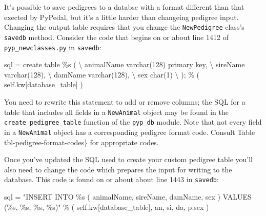 \documentclass[
  letterpaper,
  DIV=11,
  numbers=noendperiod]{scrreprt}
\newenvironment{Shaded}{\begin{snugshade}}{\end{snugshade}}
\newcommand{\NormalTok}[1]{\textcolor[rgb]{0.00,0.23,0.31}{#1}}
\newcommand{\OperatorTok}[1]{\textcolor[rgb]{0.37,0.37,0.37}{#1}}
\newcommand{\SpecialCharTok}[1]{\textcolor[rgb]{0.37,0.37,0.37}{#1}}
\newcommand{\StringTok}[1]{\textcolor[rgb]{0.13,0.47,0.30}{#1}}
\newcommand{\VariableTok}[1]{\textcolor[rgb]{0.07,0.07,0.07}{#1}}
\begin{document}
It's possible to save pedigrees to a databse with a format different
than that exected by PyPedal, but it's a little harder than changeing
pedigree input. Changing the output table requires that you change the
\texttt{NewPedigree} class's \texttt{savedb} method. Consider the code
that begins on or about line 1412 of \texttt{pyp\_newclasses.py} in
\texttt{savedb}:

\begin{Shaded}
\begin{Highlighting}[]
\NormalTok{sql }\OperatorTok{=} \StringTok{\textquotesingle{}create table }\SpecialCharTok{\%s}\StringTok{ ( }\OperatorTok{\textbackslash{}}
\StringTok{    animalName   varchar(128) primary key, }\OperatorTok{\textbackslash{}}
\StringTok{    sireName     varchar(128), }\OperatorTok{\textbackslash{}}
\StringTok{    damName      varchar(128), }\OperatorTok{\textbackslash{}}
\StringTok{    sex          char(1) }\OperatorTok{\textbackslash{}}
\StringTok{    );\textquotesingle{}} \OperatorTok{\%}\NormalTok{ ( }\VariableTok{self}\NormalTok{.kw[}\StringTok{\textquotesingle{}database\_table\textquotesingle{}}\NormalTok{] )}
\end{Highlighting}
\end{Shaded}

You need to rewrite this statement to add or remove columns; the SQL for
a table that includes all fields in a \texttt{NewAnimal} object may be
found in the \texttt{create\_pedigree\_table} function of the
\texttt{pyp\_db} module. Note that not every field in a
\texttt{NewAnimal} object has a corresponding pedigree format code.
Consult Table tbl-pedigree-format-codes\} for appropriate codes.

Once you've updated the SQL used to create your custom pedigree table
you'll also need to change the code which prepares the input for writing
to the database. This code is found on or about about line 1443 in
\texttt{savedb}:

\begin{Shaded}
\begin{Highlighting}[]
\NormalTok{sql }\OperatorTok{=} \StringTok{"INSERT INTO }\SpecialCharTok{\%s}\StringTok{ ( animalName, sireName, damName, sex ) VALUES (\textquotesingle{}}\SpecialCharTok{\%s}\StringTok{\textquotesingle{}, \textquotesingle{}}\SpecialCharTok{\%s}\StringTok{\textquotesingle{}, \textquotesingle{}}\SpecialCharTok{\%s}\StringTok{\textquotesingle{}, \textquotesingle{}}\SpecialCharTok{\%s}\StringTok{\textquotesingle{})"} \OperatorTok{\%}\NormalTok{ ( }\VariableTok{self}\NormalTok{.kw[}\StringTok{\textquotesingle{}database\_table\textquotesingle{}}\NormalTok{], an, si, da, p.sex )}
\end{Highlighting}
\end{Shaded}
\end{document}
